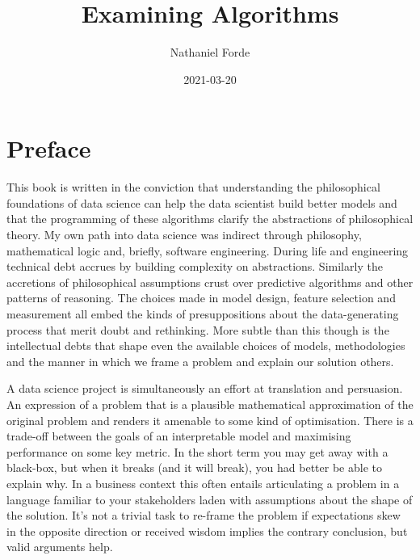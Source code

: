 \documentclass[]{tufte-book}
\title{Examining Algorithms}
\author{Nathaniel Forde}
\date{2021-03-20}
\theoremstyle{definition}
\theoremstyle{definition}
\theoremstyle{definition}
\theoremstyle{remark}
\begin{document}
\maketitle



{
\setcounter{tocdepth}{1}
\tableofcontents
}

\hypertarget{preface}{%
\chapter{Preface}\label{preface}}

This book is written in the conviction that understanding the philosophical foundations of data science can help the data scientist build better models and that the programming of these algorithms clarify the abstractions of philosophical theory. My own path into data science was indirect through philosophy, mathematical logic and, briefly, software engineering. During life and engineering technical debt accrues by building complexity on abstractions. Similarly the accretions of philosophical assumptions crust over predictive algorithms and other patterns of reasoning. The choices made in model design, feature selection and measurement all embed the kinds of presuppositions about the data-generating process that merit doubt and rethinking. More subtle than this though is the intellectual debts that shape even the available choices of models, methodologies and the manner in which we frame a problem and explain our solution others.

A data science project is simultaneously an effort at translation and persuasion. An expression of a problem that is a plausible mathematical approximation of the original problem and renders it amenable to some kind of optimisation. There is a trade-off between the goals of an interpretable model and maximising performance on some key metric. In the short term you may get away with a black-box, but when it breaks (and it will break), you had better be able to explain why. In a business context this often entails articulating a problem in a language familiar to your stakeholders laden with assumptions about the shape of the solution. It's not a trivial task to re-frame the problem if expectations skew in the opposite direction or received wisdom implies the contrary conclusion, but valid arguments help.
\end{document}
